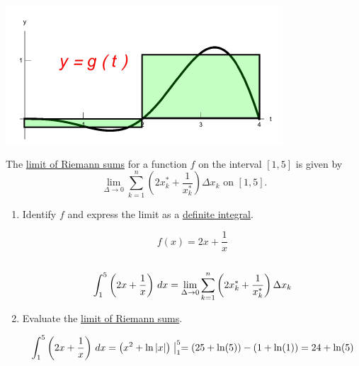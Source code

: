 \documentclass[nooutcomes,handout]{ximera}
\begin{document}
\begin{problem}
\begin{enumerate}
\begin{freeResponse}
        \begin{image}
        \includegraphics[scale=.6]{figure1.png}
        \end{image}
      \end{freeResponse}
  \end{enumerate}


\end{problem}

\begin{problem}
  The \underline{limit of Riemann sums} for a function $f$ on the interval $[1, 5]$ is given by
  \[
    \lim_{\Delta \to 0} \sum_{k = 1}^n \left(2x_k^* + \frac{1}{x_k^*} \right) \Delta x_k\mbox{ on $[1, 5]$.}
  \]
  \begin{enumerate}
    \item
      Identify $f$ and express the limit as a \underline{definite integral}.
      \begin{freeResponse}
       
        $$f(x)=2x+\frac{1}{x}$$\\
        $$\int_1^5 \left( 2x + \frac{1}{x} \right) \d x = \lim_{\Delta \to 0} \sum_{k = 1}^n \left(2x_k^* + \frac{1}{x_k^*} \right) \Delta x_k$$
      
      \end{freeResponse}

    \item
    Evaluate the \underline{limit of Riemann sums}.
    \begin{freeResponse}
      \[
        \int_1^5 \left( 2x + \frac{1}{x} \right) \,d x = \left(x^2 + \ln|x|\right) \bigm|_1^5 = (25 + \ln(5)) - (1 +\ln(1)) = 24 +\ln(5)
      \]
    \end{freeResponse}
  \end{enumerate}
  
\end{problem}
\end{document}

